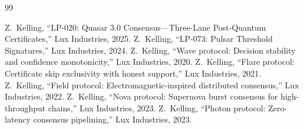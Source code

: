 \begin{thebibliography}{99}

 Z.~Kelling, ``LP-020: Quasar 3.0 Consensus---Three-Lane Post-Quantum Certificates,'' Lux Industries, 2025.
 Z.~Kelling, ``LP-073: Pulsar Threshold Signatures,'' Lux Industries, 2024.
 Z.~Kelling, ``Wave protocol: Decision stability and confidence monotonicity,'' Lux Industries, 2020.
 Z.~Kelling, ``Flare protocol: Certificate skip exclusivity with honest support,'' Lux Industries, 2021.
 Z.~Kelling, ``Field protocol: Electromagnetic-inspired distributed consensus,'' Lux Industries, 2022.
 Z.~Kelling, ``Nova protocol: Supernova burst consensus for high-throughput chains,'' Lux Industries, 2023.
 Z.~Kelling, ``Photon protocol: Zero-latency consensus pipelining,'' Lux Industries, 2023.


\end{thebibliography}
